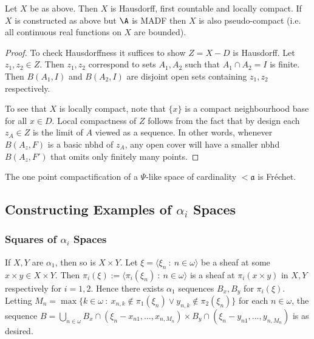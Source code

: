 \documentclass{article}
\begin{document}
\begin{prop}
    Let \(X\) be as above. Then \(X\) is Hausdorff, first countable and locally compact. If \(X\) is constructed as above but \(\A\) is MADF then \(X\) is also pseudo-compact (i.e. all continuous real functions on \(X\) are bounded).
\end{prop}

\begin{proof}
    To check Hausdorffness it suffices to show \(Z = X- D\) is Hausdorff. Let \(z_1, z_2 \in Z\). Then \(z_1, z_2\) correspond to sets \(A_1, A_2\) such that \(A_1 \cap A_2 = I\) is finite. Then \(B(A_1, I)\) and \(B(A_2, I)\) are disjoint open sets containing \(z_1, z_2\) respectively. 

    To see that \(X\) is locally compact, note that \(\{x\}\) is a compact neighbourhood base for all \(x \in D\). Local compactness of \(Z\) follows from the fact that by design each \(z_A \in Z\) is the limit of \(A\) viewed as a sequence. In other words, whenever \(B(A_z, F)\) is a basic nbhd of \(z_A\), any open cover will have a smaller nbhd \(B(A_z, F')\) that omits only finitely many points.
\end{proof}

\begin{prop}
    The one point compactification of a \(\Psi\)-like space of cardinality \(<\mathfrak{a}\) is Fréchet. 
\end{prop}

\subsection{Constructing Examples of \(\alpha_i\) Spaces}
\subsubsection{Squares of \(\alpha_i\) Spaces} 
\begin{exam}
    If \(X, Y\) are \(\alpha_1\), then so is \(X \times Y\). Let \(\xi = \langle \xi_n \: : \: n \in \omega \rangle \) be a  sheaf at some \(x\times y \in X \times Y\). Then \(\pi_i(\xi) := \langle \pi_i(\xi_n) \: : \: n \in \omega\rangle\) is a sheaf at \(\pi_i(x\times y)\) in \(X, Y\) respectively for \(i = 1, 2\). Hence there exists \(\alpha_1\) sequences \(B_x, B_y\) for \(\pi_i(\xi)\). Letting \(M_n = \max\{k \in \omega \: : \: x_{n,k} \not \in \pi_1(\xi_n) \vee y_{n,k} \not \in \pi_2(\xi_n)\} \) for each \(n \in \omega\), the sequence \(B = \bigcup_{n \in \omega}B_x \cap (\xi_n- {x_{n1}, \dots, x_{n, M_n}}) \times B_y \cap (\xi_n- {y_{n1}, \dots, y_{n, M_n}})\) is as desired.
\end{exam}
\end{document}
